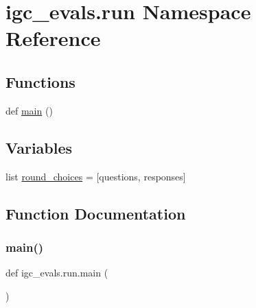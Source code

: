 \hypertarget{namespaceigc__evals_1_1run}{}\section{igc\+\_\+evals.\+run Namespace Reference}
\label{namespaceigc__evals_1_1run}
\subsection*{Functions}
\begin{DoxyCompactItemize}
\item 
def \hyperlink{namespaceigc__evals_1_1run_ac45cf85723a667c904378dacaee81ed7}{main} ()
\end{DoxyCompactItemize}
\subsection*{Variables}
\begin{DoxyCompactItemize}
\item 
list \hyperlink{namespaceigc__evals_1_1run_ae97b39ec3dea2c6577e9207f48f2e969}{round\+\_\+choices} = \mbox{[}\textquotesingle{}questions\textquotesingle{}, \textquotesingle{}responses\textquotesingle{}\mbox{]}
\end{DoxyCompactItemize}


\subsection{Function Documentation}
\mbox{\label{namespaceigc__evals_1_1run_ac45cf85723a667c904378dacaee81ed7}} 
\subsubsection{\texorpdfstring{main()}{main()}}
{\footnotesize\ttfamily def igc\+\_\+evals.\+run.\+main (\begin{DoxyParamCaption}{ }\end{DoxyParamCaption})}

